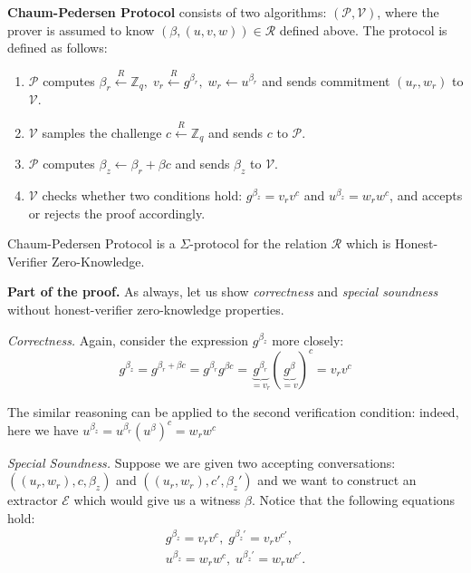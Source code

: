 \documentclass[../lecture-notes.tex]{subfiles}
\begin{document}
\vspace{-2mm}

\begin{definition}
    \textbf{Chaum-Pedersen Protocol} consists of two algorithms: $(\mathcal{P}, \mathcal{V})$, where the prover is assumed to know $(\beta,(u,v,w)) \in \mathcal{R}$ defined above. The protocol is defined as follows:
    \begin{enumerate}
        \item $\mathcal{P}$ computes $\beta_r \xleftarrow{R} \mathbb{Z}_q, \; v_r \xleftarrow{R} g^{\beta_r}, \; w_r \gets u^{\beta_r}$ and sends commitment $(u_r,w_r)$ to $\mathcal{V}$.
        \item $\mathcal{V}$ samples the challenge $c \xleftarrow{R} \mathbb{Z}_q$ and sends $c$ to $\mathcal{P}$.
        \item $\mathcal{P}$ computes $\beta_z \gets \beta_r + \beta c$ and sends $\beta_z$ to $\mathcal{V}$.
        \item $\mathcal{V}$ checks whether two conditions hold: $g^{\beta_z} = v_rv^c$ and $u^{\beta_z} = w_r w^c$, and accepts or rejects the proof accordingly.
    \end{enumerate}
\end{definition}

\vspace{-5mm}

\begin{theorem}
    Chaum-Pedersen Protocol is a $\Sigma$-protocol for the relation $\mathcal{R}$ which is Honest-Verifier Zero-Knowledge.
\end{theorem}

\vspace{-1mm}

\textbf{Part of the proof.} As always, let us show \textit{correctness} and \textit{special soundness} without honest-verifier zero-knowledge properties.

\textit{Correctness.} Again, consider the expression $g^{\beta_z}$ more closely:
\begin{equation*}
    g^{\beta_z} = g^{\beta_r + \beta c} = g^{\beta_r}g^{\beta c} = \underbrace{g^{\beta_r}}_{=v_r}(\underbrace{g^{\beta}}_{=v})^c = v_rv^c
\end{equation*}

The similar reasoning can be applied to the second verification condition: indeed, here we have $u^{\beta_z} = u^{\beta_r}(u^{\beta})^c = w_rw^c$

\textit{Special Soundness.} Suppose we are given two accepting conversations: $((u_r,w_r),c,\beta_z)$ and $((u_r,w_r),c',\beta_z')$ and we want to construct an extractor $\mathcal{E}$ which would give us a witness $\beta$. Notice that the following equations hold:
\begin{align*}
    g^{\beta_z} = v_rv^c, \; g^{\beta_z'} = v_rv^{c'}, \\ u^{\beta_z} = w_rw^c, \; u^{\beta_z'} = w_rw^{c'}.
\end{align*}
\end{document}
